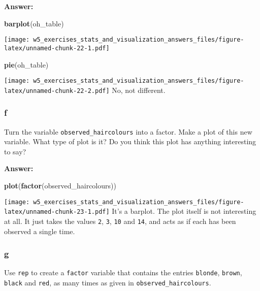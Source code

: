 \documentclass[]{article}
\newenvironment{Shaded}{\begin{snugshade}}{\end{snugshade}}
\newcommand{\KeywordTok}[1]{\textcolor[rgb]{0.13,0.29,0.53}{\textbf{#1}}}
\newcommand{\NormalTok}[1]{#1}
\begin{document}
\textbf{Answer:}

\begin{Shaded}
\begin{Highlighting}[]
\KeywordTok{barplot}\NormalTok{(oh_table)}
\end{Highlighting}
\end{Shaded}

\texttt{[image: w5\_exercises\_stats\_and\_visualization\_answers\_files/figure-latex/unnamed-chunk-22-1.pdf]}

\begin{Shaded}
\begin{Highlighting}[]
\KeywordTok{pie}\NormalTok{(oh_table)}
\end{Highlighting}
\end{Shaded}

\texttt{[image: w5\_exercises\_stats\_and\_visualization\_answers\_files/figure-latex/unnamed-chunk-22-2.pdf]}
No, not different.

\hypertarget{f}{%
\subsubsection{f}\label{f}}

Turn the variable \texttt{observed\_haircolours} into a factor. Make a
plot of this new variable. What type of plot is it? Do you think this
plot has anything interesting to say?

\textbf{Answer:}

\begin{Shaded}
\begin{Highlighting}[]
\KeywordTok{plot}\NormalTok{(}\KeywordTok{factor}\NormalTok{(observed_haircolours))}
\end{Highlighting}
\end{Shaded}

\texttt{[image: w5\_exercises\_stats\_and\_visualization\_answers\_files/figure-latex/unnamed-chunk-23-1.pdf]}
It's a barplot. The plot itself is not interesting at all. It just takes
the values \texttt{2}, \texttt{3}, \texttt{10} and \texttt{14}, and acts
as if each has been observed a single time.

\hypertarget{g}{%
\subsubsection{g}\label{g}}

Use \texttt{rep} to create a \texttt{factor} variable that contains the
entries \texttt{blonde}, \texttt{brown}, \texttt{black} and
\texttt{red}, as many times as given in \texttt{observed\_haircolours}.
\end{document}
